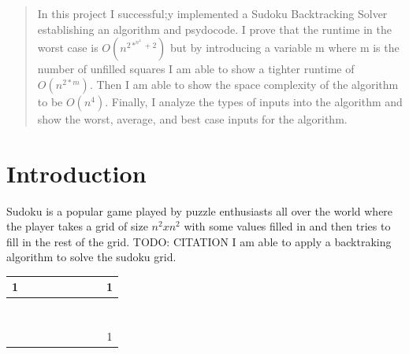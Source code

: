 \documentclass{sig-alternate}
\begin{document}
\maketitle
\begin{abstract}
In this project I successful;y implemented a Sudoku Backtracking Solver establishing an algorithm and psydocode. I prove that the runtime in the worst case is $O(n^{2*^{n^4} + 2})$ but by introducing a variable m where m is the number of unfilled squares I am able to show a tighter runtime of $O(n^{2*m})$. Then I am able to show the space complexity of the algorithm to be $O(n^4)$. Finally, I analyze the types of inputs into the algorithm and show the worst, average, and best case inputs for the algorithm. 

\end{abstract}




\section{Introduction}
Sudoku is a popular game played by puzzle enthusiasts all over the world where the player takes 
a grid of size $n^2 x n^2$ with some values filled in and then tries to fill in the rest of the grid. TODO: CITATION
I am able to apply a backtraking algorithm to solve the sudoku grid. 

\begin{center}
  \begin{tabular}{ | c | c | c | c | c | c | c | c | c |}
    \hline
    	1 & & & & & & & & 1\\ \hline
        & & & & & & & & \\ \hline
        & & & & & & & & \\ \hline
        & & & & & & & & \\ \hline
        & & & & & & & & \\ \hline
        & & & & & & & & \\ \hline
        & & & & & & & & \\ \hline
        & & & & & & & & \\ \hline
        & & & & & & & & 1 \\
    \hline
  \end{tabular}
\end{center}
\end{document}
